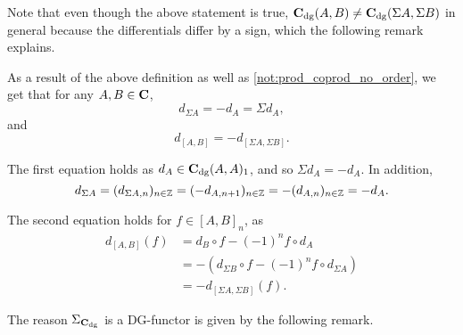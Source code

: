 Note that even though the above statement is true, \( \operatorname{\mathbf{C}}_{\operatorname{dg}}(A, B) \neq \operatorname{\mathbf{C}}_{\operatorname{dg}}(\Sigma A, \Sigma B) \) in general because the differentials differ by a sign, which the following remark explains.

\begin{remark}
    \label{rem:c_dg_sigma_d_equal_minus_d}
    As a result of the above definition as well as \autoref{not:prod_coprod_no_order}, we get that for any \( A, B \in \operatorname{\mathbf{C}} \),
    \[
        d_{\Sigma A} = - d_A = \Sigma d_A,
    \]
    and
    \[
        d_{[A, B]} = - d_{[\Sigma A, \Sigma B]}.
    \]

    The first equation holds as \( d_A \in \operatorname{\mathbf{C}}_{\operatorname{dg}}(A, A)_1 \), and so \( \Sigma d_A = - d_A \). In addition,
    \[
        d_{\Sigma A} = (d_{\Sigma A, n})_{n \in {\mathbb{Z}}} = (- d_{A, n + 1})_{n \in {\mathbb{Z}}} = - (d_{A, n})_{n \in {\mathbb{Z}}} = - d_A.
    \]

    The second equation holds for \( f \in [A, B]_n \), as
    \begin{align*}
        d_{[A, B]} (f) &= d_B \circ f - (-1)^n f \circ d_A \\
        &= - (d_{\Sigma B} \circ f - (-1)^n f \circ d_{\Sigma A}) \\
        &= - d_{[\Sigma A, \Sigma B]} (f).
    \end{align*}
\end{remark}

The reason \( \Sigma_{\operatorname{\mathbf{C}}_{\operatorname{dg}}} \) is a DG-functor is given by the following remark. 

